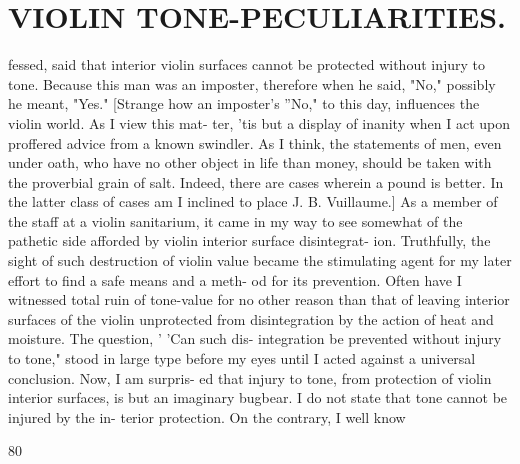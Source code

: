 \documentclass{article}
\begin{document}
\section*{VIOLIN TONE-PECULIARITIES.}
fessed, said that interior violin surfaces cannot be protected without injury to tone. Because this man was an imposter, therefore when he said, "No," possibly he meant, "Yes." [Strange how an imposter's ''No," to this day, influences the violin world. As I view this mat- ter, 'tis but a display of inanity when I act upon proffered advice from a known swindler. As I think, the statements of men, even under oath, who have no other object in life than money, should be taken with the proverbial grain of salt. Indeed, there are cases wherein a pound is better. In the latter class of cases am I inclined to place J. B. Vuillaume.] As a member of the staff at a violin sanitarium, it came in my way to see somewhat of the pathetic side afforded by violin interior surface disintegrat- ion. Truthfully, the sight of such destruction of violin value became the stimulating agent for my later effort to find a safe means and a meth- od for its prevention. Often have I witnessed total ruin of tone-value for no other reason than that of leaving interior surfaces of the violin unprotected from disintegration by the action of heat and moisture. The question, ' 'Can such dis- integration be prevented without injury to tone," stood in large type before my eyes until I acted against a universal conclusion. Now, I am surpris- ed that injury to tone, from protection of violin interior surfaces, is but an imaginary bugbear. I do not state that tone cannot be injured by the in- terior protection. On the contrary, I well know

80
\end{document}
